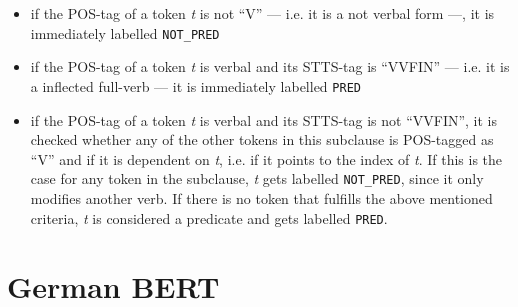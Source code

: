 \begin{itemize}
	\item if the POS-tag of a token \textit{t} is not ``V'' --- i.e. it is a not verbal form ---, it is immediately labelled \texttt{NOT\_PRED}
	\item if the POS-tag of a token \textit{t} is verbal and its  STTS-tag is ``VVFIN'' --- i.e. it is a inflected full-verb --- it is immediately labelled \texttt{PRED}
	\item if the POS-tag of a token \textit{t} is verbal and its STTS-tag is not ``VVFIN'', it is checked whether any of the other tokens in this subclause is POS-tagged as ``V'' and if it is dependent on \textit{t}, i.e. if it points to the index of \textit{t}.
	If this is the case for any token in the subclause, \textit{t} gets labelled \texttt{NOT\_PRED}, since it only modifies another verb.
	If there is no token that fulfills the above mentioned criteria, \textit{t} is considered a predicate and gets labelled \texttt{PRED}.
\end{itemize}

\section{German BERT}

